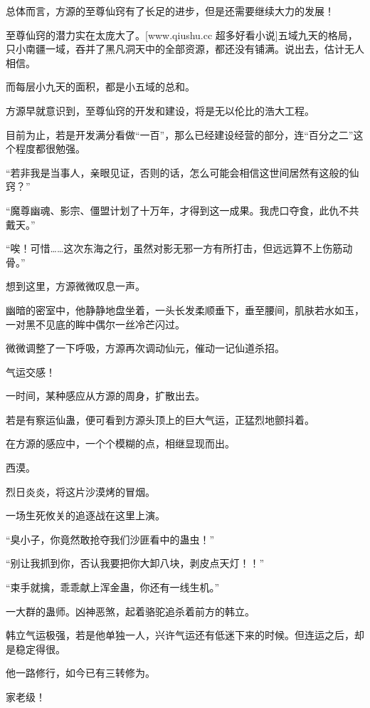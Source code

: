 
\begin{this_body}

总体而言，方源的至尊仙窍有了长足的进步，但是还需要继续大力的发展！

至尊仙窍的潜力实在太庞大了。[www.qiushu.cc 超多好看小说]五域九天的格局，只小南疆一域，吞并了黑凡洞天中的全部资源，都还没有铺满。说出去，估计无人相信。

而每层小九天的面积，都是小五域的总和。

方源早就意识到，至尊仙窍的开发和建设，将是无以伦比的浩大工程。

目前为止，若是开发满分看做“一百”，那么已经建设经营的部分，连“百分之二”这个程度都很勉强。

“若非我是当事人，亲眼见证，否则的话，怎么可能会相信这世间居然有这般的仙窍？”

“魔尊幽魂、影宗、僵盟计划了十万年，才得到这一成果。我虎口夺食，此仇不共戴天。”

“唉！可惜……这次东海之行，虽然对影无邪一方有所打击，但远远算不上伤筋动骨。”

想到这里，方源微微叹息一声。

幽暗的密室中，他静静地盘坐着，一头长发柔顺垂下，垂至腰间，肌肤若水如玉，一对黑不见底的眸中偶尔一丝冷芒闪过。

微微调整了一下呼吸，方源再次调动仙元，催动一记仙道杀招。

气运交感！

一时间，某种感应从方源的周身，扩散出去。

若是有察运仙蛊，便可看到方源头顶上的巨大气运，正猛烈地颤抖着。

在方源的感应中，一个个模糊的点，相继显现而出。

西漠。

烈日炎炎，将这片沙漠烤的冒烟。

一场生死攸关的追逐战在这里上演。

“臭小子，你竟然敢抢夺我们沙匪看中的蛊虫！”

“别让我抓到你，否认我要把你大卸八块，剥皮点天灯！！”

“束手就擒，乖乖献上浑金蛊，你还有一线生机。”

一大群的蛊师。凶神恶煞，起着骆驼追杀着前方的韩立。

韩立气运极强，若是他单独一人，兴许气运还有低迷下来的时候。但连运之后，却是稳定得很。

他一路修行，如今已有三转修为。

家老级！


\end{this_body}
